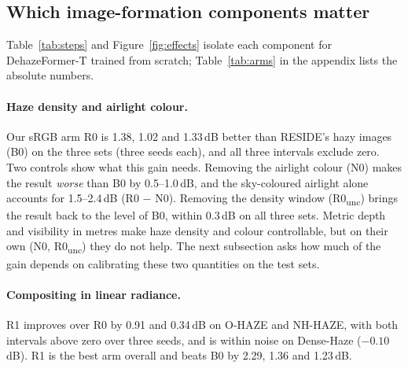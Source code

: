 \documentclass{article}
\begin{document}
\begin{table}[t]
\caption{Zero-shot results on real paired haze. All rows are evaluated with the same code at a long side of 1{,}024 pixels; no numbers are copied from papers. The upper block uses the published weights. $^{\times n}$: mean over $n$ seeds. Best value per column in bold.}
\label{tab:main}
\centering
\small
\resizebox{\linewidth}{!}{}
\end{table}

\subsection{Which image-formation components matter}
\label{sec:components}
Table~\ref{tab:steps} and Figure~\ref{fig:effects} isolate each component for DehazeFormer-T trained from scratch; Table~\ref{tab:arms} in the appendix lists the absolute numbers.

\paragraph{Haze density and airlight colour.} Our sRGB arm R0 is 1.38, 1.02 and 1.33\,dB better than RESIDE's hazy images (B0) on the three sets (three seeds each), and all three intervals exclude zero. Two controls show what this gain needs. Removing the airlight colour (N0) makes the result \emph{worse} than B0 by 0.5--1.0\,dB, and the sky-coloured airlight alone accounts for 1.5--2.4\,dB (R0 $-$ N0). Removing the density window (R0\textsubscript{unc}) brings the result back to the level of B0, within 0.3\,dB on all three sets. Metric depth and visibility in metres make haze density and colour controllable, but on their own (N0, R0\textsubscript{unc}) they do not help. The next subsection asks how much of the gain depends on calibrating these two quantities on the test sets.

\paragraph{Compositing in linear radiance.} R1 improves over R0 by 0.91 and 0.34\,dB on O-HAZE and NH-HAZE, with both intervals above zero over three seeds, and is within noise on Dense-Haze ($-0.10$\,dB). R1 is the best arm overall and beats B0 by 2.29, 1.36 and 1.23\,dB.
\end{document}
